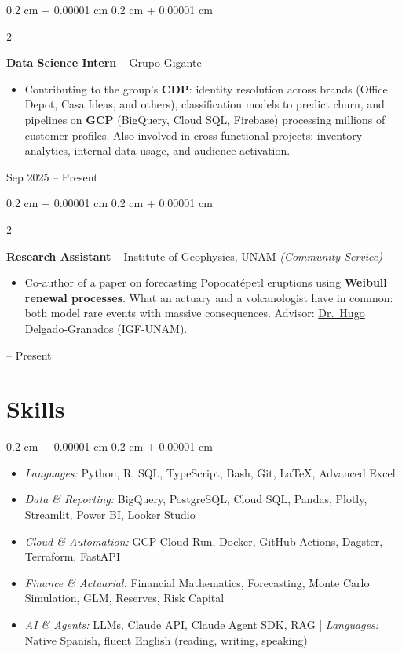\documentclass[10pt, letterpaper]{article}
\newenvironment{highlights}{
    \begin{itemize}[
        topsep=0.05 cm,
        parsep=0.05 cm,
        partopsep=0pt,
        itemsep=0pt,
        leftmargin=0.4 cm + 10pt
    ]
}{
    \end{itemize}
}
\newenvironment{highlightsforbulletentries}{
    \begin{itemize}[
        topsep=0.05 cm,
        parsep=0.05 cm,
        partopsep=0pt,
        itemsep=0pt,
        leftmargin=10pt
    ]
}{
    \end{itemize}
}
\newenvironment{onecolentry}{
    \begin{adjustwidth}{
        0.2 cm + 0.00001 cm
    }{
        0.2 cm + 0.00001 cm
    }
}{
    \end{adjustwidth}
}
\newenvironment{twocolentry}[2][]{
    \onecolentry
    \def\secondColumn{#2}
    \setcolumnwidth{\fill, 4.5 cm}
    \begin{paracol}{2}
}{
    \switchcolumn \raggedleft \secondColumn
    \end{paracol}
    \endonecolentry
}
\let\hrefWithoutArrow\href
\renewcommand{\href}[2]{\hrefWithoutArrow{#1}{\ifthenelse{\equal{#2}{}}{ }{#2 }\raisebox{.15ex}{\footnotesize \faExternalLink*}}}
\begin{document}
        \begin{twocolentry}{
            Sep 2025 -- Present
        }
            \textbf{Data Science Intern} -- Grupo Gigante
            \begin{highlights}
                \item Contributing to the group's \textbf{CDP}: identity resolution across brands (Office Depot, Casa Ideas, and others), classification models to predict churn, and pipelines on \textbf{GCP} (BigQuery, Cloud SQL, Firebase) processing millions of customer profiles. Also involved in cross-functional projects: inventory analytics, internal data usage, and audience activation.
            \end{highlights}
        \end{twocolentry}

        \vspace{0.10 cm}

        \begin{twocolentry}{
            2025 -- Present
        }
            \textbf{Research Assistant} -- Institute of Geophysics, UNAM \textit{(Community Service)}
            \begin{highlights}
                \item Co-author of a paper on forecasting Popocatépetl eruptions using \textbf{Weibull renewal processes}. What an actuary and a volcanologist have in common: both model rare events with massive consequences. Advisor: \hrefWithoutArrow{https://scholar.google.com/citations?user=lDD0DZQAAAAJ}{Dr.\ Hugo Delgado-Granados} (IGF-UNAM).
            \end{highlights}
        \end{twocolentry}


    \section{Skills}

\begin{onecolentry}
    \begin{highlightsforbulletentries}
        \item \textit{Languages:} Python, R, SQL, TypeScript, Bash, Git, \LaTeX, Advanced Excel
        \item \textit{Data \& Reporting:} BigQuery, PostgreSQL, Cloud SQL, Pandas, Plotly, Streamlit, Power BI, Looker Studio
        \item \textit{Cloud \& Automation:} GCP Cloud Run, Docker, GitHub Actions, Dagster, Terraform, FastAPI
        \item \textit{Finance \& Actuarial:} Financial Mathematics, Forecasting, Monte Carlo Simulation, GLM, Reserves, Risk Capital
        \item \textit{AI \& Agents:} LLMs, Claude API, Claude Agent SDK, RAG | \textit{Languages:} Native Spanish, fluent English (reading, writing, speaking)
    \end{highlightsforbulletentries}
\end{onecolentry}
\end{document}
